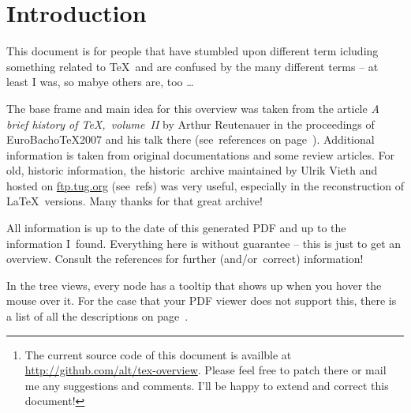 


\begin{abstract}
In the world of \TeX, there are many developments and ambiguous names. This paper tries to give an overview of the development of \TeX\ and related programs. Contributions are very welcome!\footnote{The current source code of this document is availble at \url{http://github.com/alt/tex-overview}. Please feel free to patch there or mail me any suggestions and comments. I'll be happy to extend and correct this document!}

{\centering \Large \hyperref[textextview]{Link for the impatient.}\\[2ex]}
\end{abstract}

\section*{Introduction}
This document is for people that have stumbled upon different term icluding something related to \TeX\ and are confused by the many different terms – at least I was, so mabye others are, too … 

The base frame and main idea for this overview was taken from the article \textit{A brief history of \TeX,~volume~II} by Arthur Reutenauer in the proceedings of \textsf{EuroBacho\TeX 2007} and his talk there (see~references on page~\pageref{sec:refs}). Additional information is taken from original documentations and some review articles. For old, historic information, the \textsf{historic~archive} maintained by Ulrik Vieth and hosted on \url{ftp.tug.org} (see~refs) was very useful, especially in the reconstruction of \LaTeX\ versions. Many thanks for that great archive!

All information is up to the date of this generated PDF and up to the information I~found. Everything here is without guarantee – this is just to get an overview. Consult the references for further (and/or~correct) information! 

In the tree views, every node has a tooltip that shows up when you hover the mouse over it. For the case that your PDF viewer does not support this, there is a list of all the descriptions on page~\pageref{sec:text}.

